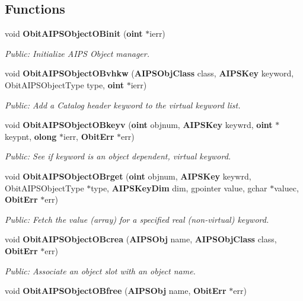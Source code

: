 \subsection*{Functions}
\begin{CompactItemize}
\item 
void {\bf Obit\-AIPSObject\-OBinit} ({\bf oint} $\ast$ierr)
\begin{CompactList}\small\item\em Public: Initialize AIPS Object manager. \item\end{CompactList}\item 
void {\bf Obit\-AIPSObject\-OBvhkw} ({\bf AIPSObj\-Class} class, {\bf AIPSKey} keyword, Obit\-AIPSObject\-Type type, {\bf oint} $\ast$ierr)
\begin{CompactList}\small\item\em Public: Add a Catalog header keyword to the virtual keyword list. \item\end{CompactList}\item 
void {\bf Obit\-AIPSObject\-OBkeyv} ({\bf oint} objnum, {\bf AIPSKey} keywrd, {\bf oint} $\ast$keypnt, {\bf olong} $\ast$ierr, {\bf Obit\-Err} $\ast$err)
\begin{CompactList}\small\item\em Public: See if keyword is an object dependent, virtual keyword. \item\end{CompactList}\item 
void {\bf Obit\-AIPSObject\-OBrget} ({\bf oint} objnum, {\bf AIPSKey} keywrd, Obit\-AIPSObject\-Type $\ast$type, {\bf AIPSKey\-Dim} dim, gpointer value, gchar $\ast$valuec, {\bf Obit\-Err} $\ast$err)
\begin{CompactList}\small\item\em Public: Fetch the value (array) for a specified real (non-virtual) keyword. \item\end{CompactList}\item 
void {\bf Obit\-AIPSObject\-OBcrea} ({\bf AIPSObj} name, {\bf AIPSObj\-Class} class, {\bf Obit\-Err} $\ast$err)
\begin{CompactList}\small\item\em Public: Associate an object slot with an object name. \item\end{CompactList}\item 
void {\bf Obit\-AIPSObject\-OBfree} ({\bf AIPSObj} name, {\bf Obit\-Err} $\ast$err)

\end{CompactItemize}
